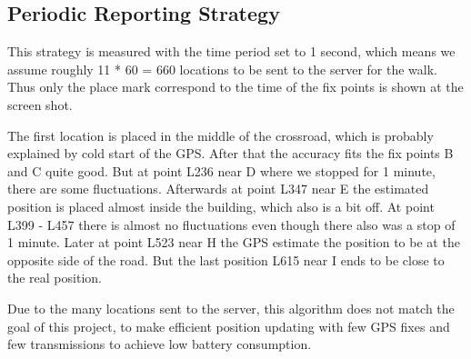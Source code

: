 \subsection{Periodic Reporting Strategy}
This strategy is measured with the time period set to 1 second, which means we assume roughly 11 * 60 = 660 locations to be sent to the server for the walk. Thus only the place mark correspond to the time of the fix points is shown at the screen shot. 

The first location is placed in the middle of the crossroad, which is probably explained by cold start of the GPS. After that the accuracy fits the fix points B and C quite good. But at point L236 near D where we stopped for 1 minute, there are some fluctuations. Afterwards at point L347 near E the estimated position is placed almost inside the building, which also is a bit off. At point L399 - L457 there is almost no fluctuations even though there also was a stop of 1 minute. Later at point L523 near H the GPS estimate the position to be at the opposite side of the road. But the last position L615 near I ends to be close to the real position.

Due to the many locations sent to the server, this algorithm does not match the goal of this project, to make efficient position updating with few GPS fixes and few transmissions to achieve low battery consumption.